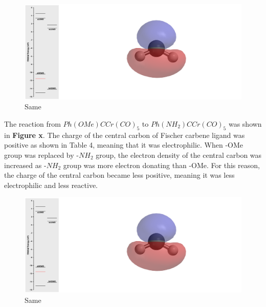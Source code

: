 \documentclass[twocolumn]{article} %
\begin{document}
\begin{figure}[h!]
      \centering
      \includegraphics[width=0.95\columnwidth]{CH2 HOMO-1.png} %
      \vspace{2mm} %
      \caption{Same}
\end{figure}

The reaction from $Ph(OMe)CCr(CO)_5$ to $Ph(NH_2)CCr(CO)_5$ was shown in \textbf{Figure x}. The charge of the central carbon of Fischer carbene ligand was positive as shown in Table 4, meaning that it was electrophilic. When -OMe group was replaced by -$NH_2$ group, the electron density of the central carbon was increased as -$NH_2$ group was more electron donating than -OMe. For this reason, the charge of the central carbon became less positive, meaning it was less electrophilic and less reactive.

\begin{figure}[h!]
      \centering
      \includegraphics[width=0.95\columnwidth]{CH2 HOMO-1.png} %
      \vspace{2mm} %
      \caption{Same}
\end{figure}
\end{document}

